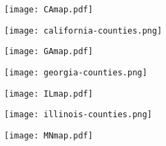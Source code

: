 \documentclass[10pt]{article}
\begin{document}
\begin{figure} 
  \begin{center}
    \texttt{[image: CAmap.pdf]}
  \end{center}
\end{figure}

\begin{figure} 
  \begin{center}
    \texttt{[image: california-counties.png]}
  \end{center}
\end{figure}

\begin{landscape}

\end{landscape}

\begin{figure} 
  \begin{center}
    \texttt{[image: GAmap.pdf]}
  \end{center}
\end{figure}

\begin{figure} 
  \begin{center}
    \texttt{[image: georgia-counties.png]}
  \end{center}
\end{figure}

\begin{landscape}

\end{landscape}

\begin{figure} 
  \begin{center}
    \texttt{[image: ILmap.pdf]}
  \end{center}
\end{figure}

\begin{figure} 
  \begin{center}
    \texttt{[image: illinois-counties.png]}
  \end{center}
\end{figure}

\begin{landscape}

\end{landscape}

\begin{figure} 
  \begin{center}
    \texttt{[image: MNmap.pdf]}
  \end{center}
\end{figure}
\end{document}
